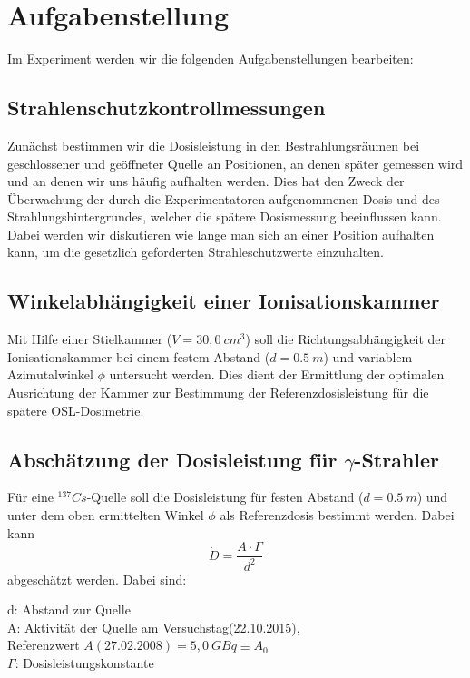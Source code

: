 \section{Aufgabenstellung}
Im Experiment werden wir die folgenden Aufgabenstellungen bearbeiten:
\subsection{Strahlenschutzkontrollmessungen}
Zunächst bestimmen wir die Dosisleistung in den Bestrahlungsräumen bei geschlossener und geöffneter Quelle an Positionen, an denen später gemessen wird und an denen wir uns häufig aufhalten werden. Dies hat den Zweck der Überwachung der durch die Experimentatoren aufgenommenen Dosis und des Strahlungshintergrundes, welcher die spätere Dosismessung beeinflussen kann. Dabei werden wir diskutieren wie lange man sich an einer Position aufhalten kann, um die gesetzlich geforderten Strahleschutzwerte einzuhalten.

\subsection{Winkelabhängigkeit einer Ionisationskammer}
Mit Hilfe einer Stielkammer ($V = 30,0\ cm^3$) soll die Richtungsabhängigkeit der Ionisationskammer bei einem festem Abstand ($d=0.5\ m$) und variablem Azimutalwinkel $\phi$ untersucht werden.
Dies dient der Ermittlung der optimalen Ausrichtung der Kammer zur Bestimmung der Referenzdosisleistung für die spätere OSL-Dosimetrie.

\subsection{Abschätzung der Dosisleistung für $\gamma$-Strahler}
Für eine $^{137}Cs$-Quelle soll die Dosisleistung für festen Abstand ($d=0.5\ m$) und unter dem oben ermittelten Winkel $\phi$ als Referenzdosis bestimmt werden. Dabei kann
\begin{equation} \label{eq:dosisleistung}
	\dot{D}=\frac{A \cdot \Gamma}{d^2}
\end{equation}
abgeschätzt werden. Dabei sind:
\begin{center}
\begin{minipage}{.9\textwidth}
	d: Abstand zur Quelle\\
	A: Aktivität der Quelle am Versuchstag(22.10.2015), \\
	Referenzwert $A(27.02.2008) = 5,0\ GBq \equiv A_0$\\
	$\Gamma$: Dosisleistungskonstante
	
\end{minipage}
\end{center}

